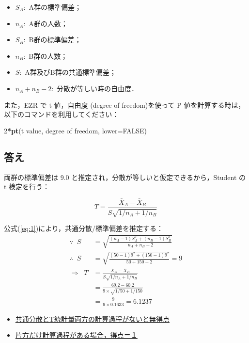 \documentclass[]{problemset}
\newenvironment{Shaded}{\begin{snugshade}}{\end{snugshade}}
\newcommand{\DataTypeTok}[1]{\textcolor[rgb]{0.13,0.29,0.53}{#1}}
\newcommand{\DecValTok}[1]{\textcolor[rgb]{0.00,0.00,0.81}{#1}}
\newcommand{\KeywordTok}[1]{\textcolor[rgb]{0.13,0.29,0.53}{\textbf{#1}}}
\newcommand{\NormalTok}[1]{#1}
\newcommand{\OperatorTok}[1]{\textcolor[rgb]{0.81,0.36,0.00}{\textbf{#1}}}
\newcommand{\OtherTok}[1]{\textcolor[rgb]{0.56,0.35,0.01}{#1}}
\providecommand{\tightlist}{%
  \setlength{\itemsep}{0pt}\setlength{\parskip}{0pt}}
\begin{document}
\begin{itemize}
\tightlist
\item
  \(S_A:\) A群の標準偏差；
\item
  \(n_A:\) A群の人数；
\item
  \(S_B:\) B群の標準偏差；
\item
  \(n_B:\) B群の人数；
\item
  \(S:\) A群及びB群の共通標準偏差；
\item
  \(n_A + n_B -2:\) 分散が等しい時の自由度．
\end{itemize}

また，EZR で t 値，自由度 (degree of freedom)を使って P
値を計算する時は，以下のコマンドを利用してください：

\begin{Shaded}
\begin{Highlighting}[]
\DecValTok{2}\OperatorTok{*}\KeywordTok{pt}\NormalTok{(t value, degree of freedom, }\DataTypeTok{lower=}\OtherTok{FALSE}\NormalTok{)}
\end{Highlighting}
\end{Shaded}

\subsection{答え}

両群の標準偏差は 9.0 と推定され，分散が等しいと仮定できるから，Student
の t 検定を行う：

\[
T = \frac{\bar{X}_A - \bar{X}_B}{S\sqrt{1/n_A + 1/n_B}}
\]

公式(\ref{eq:1})により，共通分散/標準偏差を推定する： \[
\begin{aligned}
\because\;\;  S & = \sqrt{\frac{(n_A - 1)S^2_A + (n_B - 1)S^2_B}{n_A + n_B -2}} \\
\therefore\;\; S & =  \sqrt{\frac{(50 - 1)9^2 + (150 - 1)9^2}{50 + 150 -2}} = 9 \\
\Rightarrow\;\; T & = \frac{\bar{X}_A - \bar{X}_B}{S\sqrt{1/n_A + 1/n_B}} \\ 
                  & = \frac{69.2 - 60.2}{9\times\sqrt{1/50 + 1/150}} \\ 
                  & = \frac{9}{9\times0.1633} = 6.1237
\end{aligned}
\]

\begin{itemize}
\item
  \underline{共通分散とT統計量両方の計算過程がないと無得点}
\item
  \underline{片方だけ計算過程がある場合，得点＝１}
\end{itemize}
\end{document}
